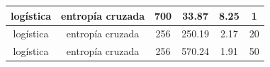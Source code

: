 \documentclass[10pt,a4paper]{article}
\begin{document}
\begin{center}
\begin{table}[H]
\begin{tabular}{|c|c|c|c|c|c|}
logística                                                             & entropía cruzada & 700                                                                    & 33.87                                                                         & 8.25                                                                 & 1                                                                                         \\ \hline
logística                                                             & entropía cruzada & 256                                                                    & 250.19                                                                        & 2.17                                                                 & 20                                                                                        \\ \hline
logística                                                             & entropía cruzada & 256                                                                    & 570.24                                                                        & 1.91                                                                 & 50                                                                                        \\ \hline
\end{tabular}
\end{table}
\end{center}
\end{document}
